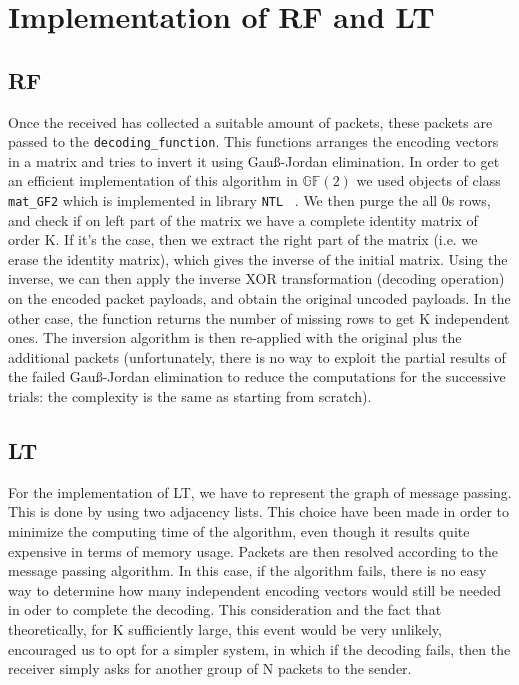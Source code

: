 \section{Implementation of RF and LT}
\subsection{RF}
Once the received has collected a suitable amount of packets, these packets are passed to the \texttt{decoding\_function}. This functions arranges the encoding vectors in a matrix and tries to invert it using Gau{\ss}-Jordan elimination. In order to get an efficient implementation of this algorithm in $\mathds{G}\mathds{F}(2)$ we used objects of class \texttt{mat\_GF2} which is implemented in library \texttt{NTL} ~\cite{NTL}. We then purge the all 0s rows, and check if on left part of the matrix we have a complete identity matrix of order K. If it's the case, then we extract the right part of the matrix  (i.e. we erase the identity matrix), which gives the inverse of the initial matrix. Using the inverse, we can then apply the inverse XOR transformation (decoding operation) on the encoded packet payloads, and obtain the original uncoded payloads. In the other case, the function returns the number of missing rows to get K independent ones. The inversion algorithm is then re-applied with the original plus the additional packets (unfortunately, there is no way to exploit the partial results of the failed Gau{\ss}-Jordan elimination to reduce the computations for the successive trials: the complexity is the same as starting from scratch).
\subsection{LT}
For the implementation of LT, we have to represent the graph of message passing. This is done by using two adjacency lists. This choice have been made in order to minimize the computing time of the algorithm, even though it results quite expensive in terms of memory usage. Packets are then resolved according to the message passing algorithm. In this case, if the algorithm fails, there is no easy way to determine how many independent encoding vectors would still be needed in oder to complete the decoding. This consideration and the fact that theoretically, for K sufficiently large, this event would be very unlikely, encouraged us to opt for a simpler system, in which if the decoding fails, then the receiver simply asks for another group of N packets to the sender. 